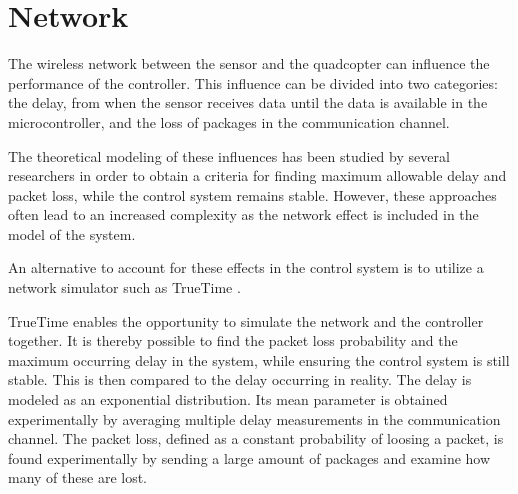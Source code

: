 \section{Network}
The wireless network between the sensor and the quadcopter can influence the performance of the controller. This influence can be divided into two categories: the delay, from when the sensor receives data until the data is available in the microcontroller, and the loss of packages in the communication channel.


The theoretical modeling of these influences has been studied by several researchers in order to obtain a criteria for finding maximum allowable delay and packet loss, while the control system remains stable. However, these approaches often lead to an increased complexity as the network effect is included in the model of the system.

An alternative to account for these effects in the control system is to utilize a network simulator such as TrueTime \cite{TrueTimeNew}.

TrueTime enables the opportunity to simulate the network and the controller together. It is thereby possible to find the packet loss probability and the maximum occurring delay in the system, while ensuring the control system is still stable. This is then compared to the delay occurring in reality. The delay is modeled as an exponential distribution. Its mean parameter is obtained experimentally by averaging multiple delay measurements in the communication channel. The packet loss, defined as a constant probability of loosing a packet, is found experimentally by sending a large amount of packages and examine how many of these are lost.  

